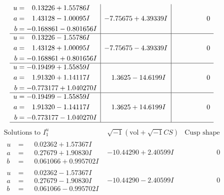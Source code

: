 \documentclass[1p]{elsarticle_modified}
\theoremstyle{definition}
\newcommand{\I}{\sqrt{-1}}
\begin{document}
$$\begin{array}{c|c|c}
\begin{aligned}
u &= \phantom{-}0.13226 + 1.55786 I \\
a &= \phantom{-}1.43128 - 1.00095 I \\
b &= -0.168861 - 0.801656 I\end{aligned}
 & -7.75675 + 4.39339 I & \phantom{-0.000000 } 0 \\ \hline\begin{aligned}
u &= \phantom{-}0.13226 - 1.55786 I \\
a &= \phantom{-}1.43128 + 1.00095 I \\
b &= -0.168861 + 0.801656 I\end{aligned}
 & -7.75675 - 4.39339 I & \phantom{-0.000000 } 0 \\ \hline\begin{aligned}
u &= -0.19499 + 1.55859 I \\
a &= \phantom{-}1.91320 + 1.14117 I \\
b &= -0.773177 + 1.040270 I\end{aligned}
 & \phantom{-}1.3625 - 14.6199 I & \phantom{-0.000000 } 0 \\ \hline\begin{aligned}
u &= -0.19499 - 1.55859 I \\
a &= \phantom{-}1.91320 - 1.14117 I \\
b &= -0.773177 - 1.040270 I\end{aligned}
 & \phantom{-}1.3625 + 14.6199 I & \phantom{-0.000000 } 0\\
 \hline 
 \end{array}$$\newpage$$\begin{array}{c|c|c}  
\text{Solutions to }I^u_{1}& \I (\text{vol} + \sqrt{-1}CS) & \text{Cusp shape}\\
 \hline 
\begin{aligned}
u &= \phantom{-}0.02362 + 1.57367 I \\
a &= \phantom{-}0.27679 + 1.90830 I \\
b &= \phantom{-}0.061066 + 0.995702 I\end{aligned}
 & -10.44290 + 2.40599 I & \phantom{-0.000000 } 0 \\ \hline\begin{aligned}
u &= \phantom{-}0.02362 - 1.57367 I \\
a &= \phantom{-}0.27679 - 1.90830 I \\
b &= \phantom{-}0.061066 - 0.995702 I\end{aligned}
 & -10.44290 - 2.40599 I & \phantom{-0.000000 } 0 \\ \hline\begin{aligned}

\end{aligned}
\end{array}$$
\end{document}
